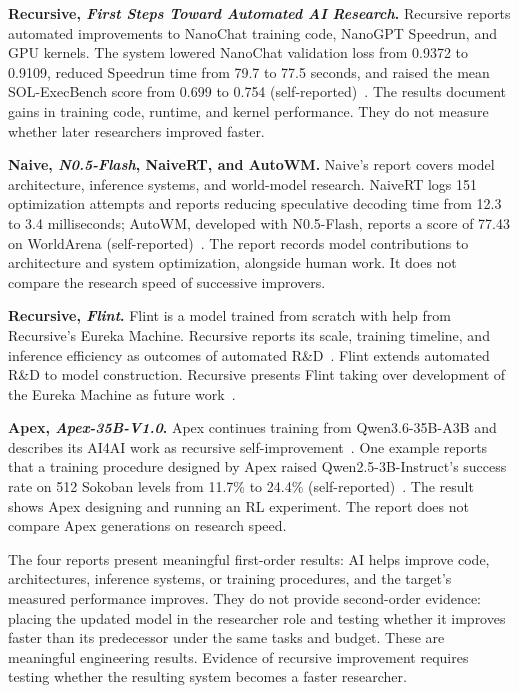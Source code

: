 \documentclass{article}
\begin{document}
\textbf{Recursive, \emph{First Steps Toward Automated AI Research}.} Recursive reports automated improvements to NanoChat training code, NanoGPT Speedrun, and GPU kernels. The system lowered NanoChat validation loss from 0.9372 to 0.9109, reduced Speedrun time from 79.7 to 77.5 seconds, and raised the mean SOL-ExecBench score from 0.699 to 0.754 (self-reported)~\cite{REL-RF}. The results document gains in training code, runtime, and kernel performance. They do not measure whether later researchers improved faster.

\textbf{Naive, \emph{N0.5-Flash}, NaiveRT, and AutoWM.} Naive's report covers model architecture, inference systems, and world-model research. NaiveRT logs 151 optimization attempts and reports reducing speculative decoding time from 12.3 to 3.4 milliseconds; AutoWM, developed with N0.5-Flash, reports a score of 77.43 on WorldArena (self-reported)~\cite{REL-NV}. The report records model contributions to architecture and system optimization, alongside human work. It does not compare the research speed of successive improvers.

\textbf{Recursive, \emph{Flint}.} Flint is a model trained from scratch with help from Recursive's Eureka Machine. Recursive reports its scale, training timeline, and inference efficiency as outcomes of automated R\&D~\cite{REL-FL}. Flint extends automated R\&D to model construction. Recursive presents Flint taking over development of the Eureka Machine as future work~\cite{REL-FL}.

\textbf{Apex, \emph{Apex-35B-V1.0}.} Apex continues training from Qwen3.6-35B-A3B and describes its AI4AI work as recursive self-improvement~\cite{REL-AX}. One example reports that a training procedure designed by Apex raised Qwen2.5-3B-Instruct's success rate on 512 Sokoban levels from 11.7\% to 24.4\% (self-reported)~\cite{REL-AX}. The result shows Apex designing and running an RL experiment. The report does not compare Apex generations on research speed.

The four reports present meaningful first-order results: AI helps improve code, architectures, inference systems, or training procedures, and the target's measured performance improves. They do not provide second-order evidence: placing the updated model in the researcher role and testing whether it improves faster than its predecessor under the same tasks and budget. These are meaningful engineering results. Evidence of recursive improvement requires testing whether the resulting system becomes a faster researcher.
\end{document}
